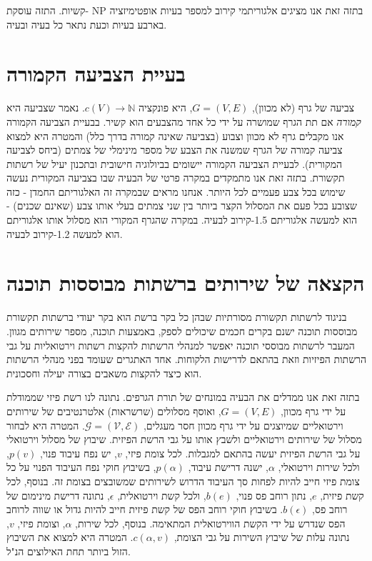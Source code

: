 \begin{hebrew}
בתזה זאת אנו מציגים אלגוריתמי קירוב למספר בעיות אופטימיזציה
$\text{NP}$%
-קשיות.
התזה עוסקת בארבע בעיות וכעת נתאר כל בעיה ובעיה.

\section*{\texthebrew{בעיית הצביעה הקמורה}}
צביעה של גרף (לא מכוון),
$G = (V, E)$,
 היא פונקציה
$c(V) \to \mathbb{N}$.
נאמר שצביעה היא
\emph{קמורה}
אם תת הגרף שמושרה על ידי כל אחד מהצבעים הוא קשיר.
בבעיית הצביעה הקמורה אנו מקבלים גרף לא מכוון וצבוע (בצביעה שאינה קמורה בדרך כלל) והמטרה היא למצוא צביעה קמורה של הגרף שמשנה את הצבע של מספר מינימלי של צמתים (ביחס לצביעה המקורית).
לבעיית הצביעה הקמורה יישומים בביולוגיה חישובית ובתכנון יעיל של רשתות תקשורת.
בתזה זאת אנו מתמקדים במקרה פרטי של הבעיה שבו בצביעה המקורית נעשה שימוש בכל צבע פעמיים לכל היותר.
אנחנו מראים שבמקרה זה האלגוריתם החמדן - כזה שצובע בכל פעם את המסלול הקצר ביותר בין שני צמתים בעלי אותו צבע (שאינם שכנים) - הוא למעשה אלגוריתם 1.5-קירוב לבעיה.
במקרה שהגרף המקורי הוא מסלול אותו אלגוריתם הוא למעשה 1.2-קירוב לבעיה.


\section*{\texthebrew{הקצאה של שירותים ברשתות מבוססות תוכנה}}
בניגוד לרשתות תקשורת מסורתיות שבהן כל בקר ברשת הוא בקר יעודי ברשתות תקשורת מבוססות תוכנה ישנם בקרים חכמים שיכולים לספק, באמצעות תוכנה, מספר שירותים מגוון.
המעבר לרשתות מבוססי תוכנה יאפשר למנהלי הרשתות להקצות רשתות וירטואליות על גבי הרשתות הפיזיות וזאת בהתאם לדרישות הלקוחות.
אחד האתגרים שעומד בפני מנהלי הרשתות הוא כיצד להקצות משאבים בצורה יעילה וחסכונית.

בתזה זאת אנו ממדלים את הבעיה במונחים של תורת הגרפים.
נתונה לנו רשת פיזי שממודלת על ידי גרף מכוון,
$G=(V,E)$,
ואוסף מסלולים (שרשראות) אלטרנטיבים של שירותים וירטואליים שמיוצגים על ידי גרף מכוון חסר מעגלים,
$\mathcal{G} = (\mathcal{V}, \mathcal{E})$.
המטרה היא לבחור מסלול של שירותים וירטואליים ולשבץ אותו על גבי הרשת הפיזית.
שיבוץ של מסלול וירטואלי על גבי הרשת הפיזית יעשה בהתאם למגבלות.
לכל צומת פיזי,
$v$,
 יש נפח עיבוד פנוי,
$p(v)$,
ולכל שירות וירטואלי,
$\alpha$,
ישנה דרישת עיבוד,
$p(\alpha)$,
בשיבוץ חוקי נפח העיבוד הפנוי על כל צומת פיזי חייב להיות לפחות סך העיבוד הדרוש לשירותים שמשובצים בצומת זה.
בנוסף, לכל קשת פיזית,
$e$,
נתון רוחב פס פנוי,
$b(e)$,
ולכל קשת וירטואלית,
$\epsilon$,
נתונה דרישת מינימום של רוחב פס,
$b(\epsilon)$.
בשיבוץ חוקי רוחב הפס של קשת פיזית חייב להיות גדול או שווה לרוחב הפס שנדרש על ידי הקשת הווירטואלית  המתאימה.
בנוסף, לכל שירות,
$\alpha$,
וצומת פיזי,
$v$,
נתונה עלות של שיבוץ השירות על גבי הצומת,
$c(\alpha, v)$.
המטרה היא למצוא את השיבוץ הזול ביותר תחת האילוצים הנ"ל.


\end{hebrew}
